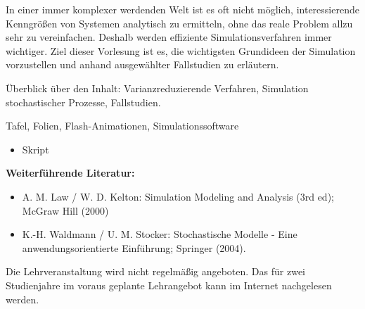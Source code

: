 \begin{course}
\begin{content}
In einer immer komplexer werdenden Welt ist es oft nicht möglich, interessierende Kenngrößen von Systemen analytisch zu ermitteln, ohne das reale Problem allzu sehr zu vereinfachen. Deshalb werden effiziente Simulationsverfahren immer wichtiger. Ziel dieser Vorlesung ist es, die wichtigsten Grundideen der Simulation vorzustellen und anhand ausgewählter Fallstudien zu erläutern.

 

Überblick über den Inhalt: Varianzreduzierende Verfahren, Simulation stochastischer Prozesse, Fallstudien.


\end{content}

\begin{media}Tafel, Folien, Flash-Animationen, Simulationssoftware

\end{media}

\begin{literature}\begin{itemize}\item Skript  \end{itemize}

\textbf{Weiterführende Literatur:}

 \begin{itemize}\item A. M. Law / W. D. Kelton: Simulation Modeling and Analysis (3rd ed); McGraw Hill (2000)  \item K.-H. Waldmann / U. M. Stocker: Stochastische Modelle - Eine anwendungsorientierte Einführung; Springer (2004).  \end{itemize}\end{literature}

\begin{remarks}Die Lehrveranstaltung wird nicht regelmäßig angeboten. Das für zwei Studienjahre im voraus geplante Lehrangebot kann im Internet nachgelesen werden.

\end{remarks}

\end{course}